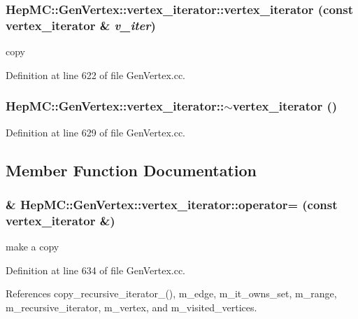 \subsubsection{\setlength{\rightskip}{0pt plus 5cm}Hep\-MC::Gen\-Vertex::vertex\_\-iterator::vertex\_\-iterator (const {\bf vertex\_\-iterator} \& {\em v\_\-iter})}\label{classHepMC_1_1GenVertex_1_1vertex__iterator_9d93fb7e21b7fa11931e2e6f1bcaa7d4}


copy 



Definition at line 622 of file Gen\-Vertex.cc.
\subsubsection{\setlength{\rightskip}{0pt plus 5cm}Hep\-MC::Gen\-Vertex::vertex\_\-iterator::$\sim$vertex\_\-iterator ()\hspace{0.3cm}{\tt  [virtual]}}\label{classHepMC_1_1GenVertex_1_1vertex__iterator_75c92b6bb929bd1781181b2ee84f9f2d}




Definition at line 629 of file Gen\-Vertex.cc.

\subsection{Member Function Documentation}
\subsubsection{ \& Hep\-MC::Gen\-Vertex::vertex\_\-iterator::operator= (const {\bf vertex\_\-iterator} \&)}\label{classHepMC_1_1GenVertex_1_1vertex__iterator_475c7881e73fdce6938815b1d04ffdcf}


make a copy 



Definition at line 634 of file Gen\-Vertex.cc.

References copy\_\-recursive\_\-iterator\_\-(), m\_\-edge, m\_\-it\_\-owns\_\-set, m\_\-range, m\_\-recursive\_\-iterator, m\_\-vertex, and m\_\-visited\_\-vertices.
